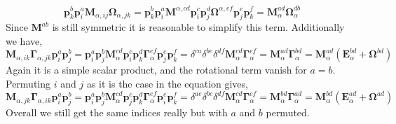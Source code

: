 \begin{equation}
    \textbf{p}_k^b\textbf{p}_i^a 
    \textbf{M}_{\alpha,ij} 
    \bm\Omega_{\alpha,jk} 
    = 
    \textbf{p}_k^b\textbf{p}_i^a 
    \textbf{M}^{\alpha,cd} \textbf{p}_i^c\textbf{p}_j^d
    \bm\Omega^{\alpha,ef} \textbf{p}_j^e\textbf{p}_k^f 
    = 
    \textbf{M}^{ad}_\alpha
    \bm\Omega^{db}_\alpha
\end{equation}
Since $\textbf{M}^{ab}$ is still symmetric it is reasonable to simplify this term. 
Additionally we have,
\begin{equation}
    \textbf{M}_{\alpha,ik}  \bm\Gamma_{\alpha,jk}\textbf{p}_i^a \textbf{p}_j^b
    = 
    \textbf{p}_i^a \textbf{p}_j^b
    \textbf{M}_\alpha^{cd} \textbf{p}^c_i \textbf{p}^d_k 
    \bm\Gamma_\alpha^{ef} \textbf{p}_j^e \textbf{p}_k^f
    = \delta^{ca}\delta^{be}\delta^{df}
     \textbf{M}_\alpha^{cd}
    \bm\Gamma_\alpha^{ef}
    = 
     \textbf{M}_\alpha^{ad}
    \bm\Gamma_\alpha^{bd}
    = 
    \textbf{M}_\alpha^{ad}
   (\textbf{E}_\alpha^{bd} + \bm\Omega^{bd})
\end{equation}
Again it is a simple scalar product, and the rotational term vanish for $a=b$. 
Permuting $i$ and $j$ as it is the case in the equation gives, 
\begin{equation}
    \textbf{M}_{\alpha,jk}  \bm\Gamma_{\alpha,ik}\textbf{p}_i^a \textbf{p}_j^b
    = 
    \textbf{p}_i^a \textbf{p}_j^b
    \textbf{M}_\alpha^{cd} \textbf{p}^c_j \textbf{p}^d_k 
    \bm\Gamma_\alpha^{ef} \textbf{p}_i^e \textbf{p}_k^f
    = \delta^{ae}\delta^{bc}\delta^{df}
     \textbf{M}_\alpha^{cd}
    \bm\Gamma_\alpha^{ef}
    = 
     \textbf{M}_\alpha^{bd}
    \bm\Gamma_\alpha^{ad}
    = 
    \textbf{M}_\alpha^{bd}
   (\textbf{E}_\alpha^{ad} + \bm\Omega^{ad})
\end{equation}
Overall we still get the same indices really but with $a$ and $b$ permuted. 


